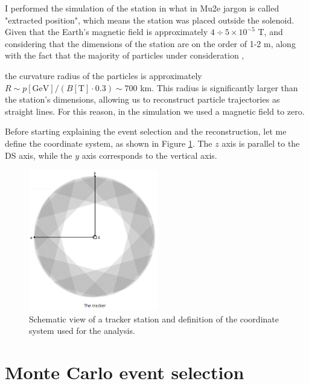I performed the simulation of the station in what in Mu2e jargon is called
"extracted position", which means the station was placed outside the solenoid.
Given that the Earth's magnetic field is approximately 
$4 \div 5 \times 10^{-5}$ T, 
and considering that the dimensions of the station are 
on the order of 1-2 m, 
along with the fact that the majority of particles under consideration
,

the curvature radius of the particles is approximately 
$R\sim p[\text{GeV}]/(B[\text{T}]\cdot 0.3) \sim 700$ km. 
This radius is significantly larger than the station's 
dimensions, allowing us to reconstruct particle trajectories 
as straight lines.
For this reason, in the simulation we used a 
magnetic field  to zero. 

Before starting explaining the event selection and the 
reconstruction, let me define the coordinate system, 
as shown in Figure \ref{fig:coordinate}. The $z$ axis is parallel to 
the DS axis, while the $y$ axis corresponds to the vertical axis.
\begin{figure}[!h]
    \centering
    \includegraphics[width =0.5\textwidth]{figures/png/Screenshot_20240526_164527.png}
    \caption[Schematic view of a tracker station and the coordinate system.]{Schematic view of a tracker station and definition of the coordinate system used for the analysis.}
    \label{fig:coordinate}
\end{figure}
\section{Monte Carlo event selection}\label{eventselection}

